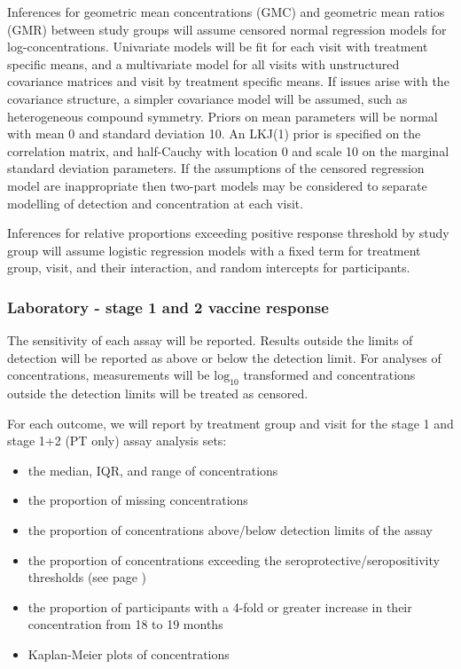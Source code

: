 \documentclass{bmcart}
\begin{document}
Inferences for geometric mean concentrations (GMC) and geometric mean ratios (GMR) between study groups will assume censored normal regression models for log-concentrations. 
Univariate models will be fit for each visit with treatment specific means, and a multivariate model for all visits with unstructured covariance matrices and visit by treatment specific means.
If issues arise with the covariance structure, a simpler covariance model will be assumed, such as heterogeneous compound symmetry.
Priors on mean parameters will be normal with mean 0 and standard deviation 10. 
An LKJ(1) prior is specified on the correlation matrix, and half-Cauchy with location 0 and scale 10 on the marginal standard deviation parameters.
If the assumptions of the censored regression model are inappropriate then two-part models may be considered to separate modelling of detection and concentration at each visit.

Inferences for relative proportions exceeding positive response threshold by study group will assume logistic regression models with a fixed term for treatment group, visit, and their interaction, and random intercepts for participants.

\subsubsection*{Laboratory - stage 1 and 2 vaccine response}

The sensitivity of each assay will be reported. 
Results outside the limits of detection will be reported as above or below the detection limit. 
For analyses of concentrations, measurements will be $\text{log}_{10}$ transformed and concentrations outside the detection limits will be treated as censored.

For each outcome, we will report by treatment group and visit for the stage 1 and stage 1+2 (PT only) assay analysis sets:
\begin{itemize}
	\item the median, IQR, and range of concentrations
	\item the proportion of missing concentrations
	\item the proportion of concentrations above/below detection limits of the assay
	\item the proportion of concentrations exceeding the seroprotective/seropositivity thresholds (see page \pageref{lab:sero-thresholds})
	\item the proportion of participants with a 4-fold or greater increase in their concentration from 18 to 19 months 
	\item Kaplan-Meier plots of concentrations
\end{itemize}
\end{document}
